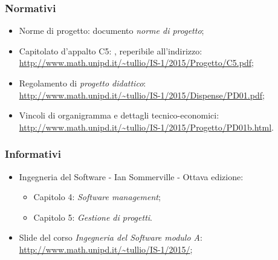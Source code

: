 \subsubsection{Normativi}
	\begin{itemize}
		\item Norme di progetto: documento \textit{norme di progetto};
		\item Capitolato d'appalto C5: \textit{\progetto}, reperibile all'indirizzo:\\
		\url{http://www.math.unipd.it/~tullio/IS-1/2015/Progetto/C5.pdf};
		\item Regolamento di \textit{progetto didattico}:\\
		\url{http://www.math.unipd.it/~tullio/IS-1/2015/Dispense/PD01.pdf};
		\item Vincoli di organigramma e dettagli tecnico-economici:
		\url{http://www.math.unipd.it/~tullio/IS-1/2015/Progetto/PD01b.html}.
	\end{itemize}
\subsubsection{Informativi}
	\begin{itemize}
		\item Ingegneria del Software - Ian Sommerville - Ottava edizione:
		\begin{itemize}
			\item Capitolo 4: \textit{Software management};
			\item Capitolo 5: \textit{Gestione di progetti}.
		\end{itemize}
		\item Slide del corso \textit{Ingegneria del Software modulo A}:
		\url{http://www.math.unipd.it/~tullio/IS-1/2015/};
	\end{itemize}

